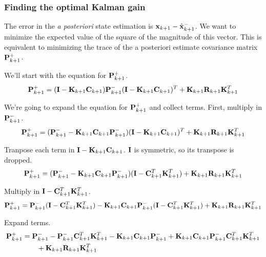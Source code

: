 \subsubsection{Finding the optimal Kalman gain}

The error in the \textit{a posteriori} \gls{state} estimation is
$\mathbf{x}_{k+1} - \hat{\mathbf{x}}_{k+1}^-$. We want to minimize the expected value
of the square of the magnitude of this vector. This is equivalent to minimizing
the trace of the a posteriori estimate covariance matrix $\mathbf{P}_{k+1}^+$.

We'll start with the equation for $\mathbf{P}_{k+1}^+$.
\begin{equation*}
  \mathbf{P}_{k+1}^+ = (\mathbf{I} - \mathbf{K}_{k+1}\mathbf{C}_{k+1})\mathbf{P}_{k+1}^-
    (\mathbf{I} - \mathbf{K}_{k+1}\mathbf{C}_{k+1})^T + \mathbf{K}_{k+1}\mathbf{R}_{k+1}
    \mathbf{K}_{k+1}^T
\end{equation*}

We're going to expand the equation for $\mathbf{P}_{k+1}^+$ and collect terms.
First, multiply in $\mathbf{P}_{k+1}^-$.
\begin{equation*}
  \mathbf{P}_{k+1}^+ =
    (\mathbf{P}_{k+1}^- - \mathbf{K}_{k+1}\mathbf{C}_{k+1}\mathbf{P}_{k+1}^-)
    (\mathbf{I} - \mathbf{K}_{k+1}\mathbf{C}_{k+1})^T + \mathbf{K}_{k+1}\mathbf{R}_{k+1}
    \mathbf{K}_{k+1}^T
\end{equation*}

Tranpose each term in $\mathbf{I} - \mathbf{K}_{k+1}\mathbf{C}_{k+1}$. $\mathbf{I}$ is
symmetric, so its transpose is dropped.
\begin{equation*}
  \mathbf{P}_{k+1}^+ =
    (\mathbf{P}_{k+1}^- - \mathbf{K}_{k+1}\mathbf{C}_{k+1}\mathbf{P}_{k+1}^-)
    (\mathbf{I} - \mathbf{C}_{k+1}^T\mathbf{K}_{k+1}^T) +
    \mathbf{K}_{k+1}\mathbf{R}_{k+1} \mathbf{K}_{k+1}^T
\end{equation*}

Multiply in $\mathbf{I} - \mathbf{C}_{k+1}^T\mathbf{K}_{k+1}^T$.
\begin{equation*}
  \mathbf{P}_{k+1}^+ =
    \mathbf{P}_{k+1}^-(\mathbf{I} - \mathbf{C}_{k+1}^T\mathbf{K}_{k+1}^T) -
    \mathbf{K}_{k+1}\mathbf{C}_{k+1}\mathbf{P}_{k+1}^-
    (\mathbf{I} - \mathbf{C}_{k+1}^T\mathbf{K}_{k+1}^T) +
    \mathbf{K}_{k+1}\mathbf{R}_{k+1} \mathbf{K}_{k+1}^T
\end{equation*}

Expand terms.
\begin{align*}
  \mathbf{P}_{k+1}^+ &=
    \mathbf{P}_{k+1}^- - \mathbf{P}_{k+1}^-\mathbf{C}_{k+1}^T\mathbf{K}_{k+1}^T -
    \mathbf{K}_{k+1}\mathbf{C}_{k+1}\mathbf{P}_{k+1}^- +
    \mathbf{K}_{k+1}\mathbf{C}_{k+1}\mathbf{P}_{k+1}^-\mathbf{C}_{k+1}^T\mathbf{K}_{k+1}^T \\
    &\qquad + \mathbf{K}_{k+1}\mathbf{R}_{k+1} \mathbf{K}_{k+1}^T
\end{align*}


